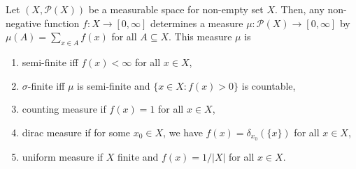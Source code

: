 \documentclass[a4paper,english,12pt]{article}
\begin{document}
\begin{prop} Let $(X, \mathcal{P}(X))$ be a measurable space for non-empty set $X$. Then, any non-negative function $f: X \to [0, \infty]$ determines a measure $\mu: \mathcal{P}(X) \to [0, \infty]$ by $\mu(A) = \sum_{x \in A}f(x)$ for all $A \subseteq X$. This measure $\mu$ is
\begin{enumerate}
	\item semi-finite iff $f(x) < \infty$ for all $x \in X$,
	\item $\sigma$-finite iff $\mu$ is semi-finite and $\{x \in X: f(x) > 0\}$ is countable,
	\item counting measure if $f(x) = 1$ for all $x \in X$,
	\item dirac measure if for some $x_0 \in X$, we have $f(x) = \delta_{x_0}(\{x\})$ for all $x \in X$,%
	\item uniform measure if $X$ finite and $f(x) = 1/|X|$ for all $x \in X$.
\end{enumerate}
\end{prop}
\end{document}

